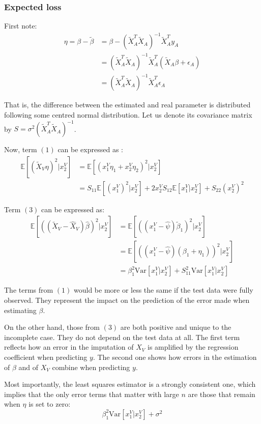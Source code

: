 			\subsubsection{Expected loss}
First note:
\begin{align*}
\eta = \beta - \tilde{\beta} &= \beta - (\tilde{X}_A^T \tilde{X}_A)^{-1} \tilde{X}_A^T y_A \\
		&= (\tilde{X}_A^T \tilde{X}_A)^{-1} \tilde{X}_A^T (\tilde{X}_A \beta + \epsilon_A) \\
		&= (\tilde{X}_A^T \tilde{X}_A)^{-1} \tilde{X}_A^T \epsilon_A
\end{align*}

That is, the difference between the estimated and real parameter is distributed following some centred normal distribution. Let us denote its covariance matrix by $S = \sigma^2 (\tilde{X}_A^T \tilde{X}_A)^{-1} $.

Now, term $(1)$ can be expressed as :
\begin{align*}
\mathbb{E}[(\tilde{X}_V \eta)^2 \vert x^V_2] &= \mathbb{E}[(x^V_1 \eta_1 + x^V_2 \eta_2)^2\vert x^V_2] \\
											&= S_{11} \mathbb{E}[(x^V_1)^2 \vert x^V_2]  + 2x^V_2 S_{12} \mathbb{E}[x^V_1 \vert x^V_2] + S_{22} (x^V_2)^2
\end{align*}

Term $(3)$ can be expressed as:
\begin{align*}
\mathbb{E}[((\tilde{X}_V - \hat{X}_V) \hat{\beta})^2 \vert x^V_2]&= \mathbb{E}[((x^V_1 - \hat{\psi})\tilde{\beta}_1)^2 \vert x^V_2] \\
									 &= \mathbb{E}[((x^V_1 - \hat{\psi})(\beta_1 + \eta_1))^2 \vert x^V_2] \\
									&= \beta_1^2 \text{Var}[x^V_1 \vert x^V_2] + S_{11}^2 \text{Var}[x^V_1 \vert x^V_2] 
\end{align*}

The terms from $(1)$ would be more or less the same if the test data were fully observed. They represent the impact on the prediction of the error made when estimating $\beta$.

 On the other hand, those from $(3)$ are both positive and unique to the incomplete case. They do not depend on the test data at all. The first term reflects how an error in the imputation of $X_V$ is amplified by the regression coefficient when predicting $y$. The second one shows how errors in the estimation of $\beta$ and of $X_V$ combine when predicting $y$.
 
 Most importantly, the least squares estimator is a strongly consistent one\cite{consistency_linreg}, which implies that the only error terms that matter with large $n$ are those that remain when $\eta$ is set to zero:
 $$ \beta_1^2 \text{Var}[x^V_1 \vert x^V_2] + \sigma^2 $$
 
